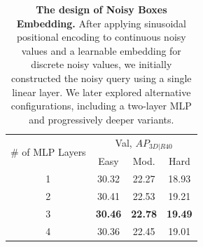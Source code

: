 \begin{table}[h!]
    \centering
    \caption{\textbf{The design of Noisy Boxes Embedding.} After applying sinusoidal positional encoding to continuous noisy values and a learnable embedding for discrete noisy values, we initially constructed the noisy query using a single linear layer. We later explored alternative configurations, including a two-layer MLP and progressively deeper variants.} 
    \begin{tabular}{c|ccc}
         \toprule
         \multirow{2}{*}{\# of MLP Layers} & \multicolumn{3}{c}{Val, $AP_{3D|R40}$} \\
          & Easy & Mod. & Hard \\ \midrule \midrule
         1 &  30.32 & 22.27 & 18.93 \\
         2 & 30.41 & 22.53 & 19.21\\
         3 & \textbf{30.46} & \textbf{22.78} & \textbf{19.49} \\
         4 & 30.36 & 22.45 & 19.01 \\
         \bottomrule
    \end{tabular}
    \label{tab:mlp_noisy_embed}
\end{table}